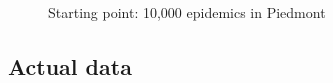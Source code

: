 \documentclass[graybox]{svmult}
\begin{document}
\begin{figure}[t]

     \begin{subfigure}{0.48\textwidth}
         \centering
         \label{10kNoControl}
     \end{subfigure}
     \hfill
     \begin{subfigure}{0.48\textwidth}
         \centering
         \label{10kBasicC}
     \end{subfigure}
     \caption{Starting point: 10,000 epidemics in Piedmont}
     \label{withoutWithFig}
\end{figure}


\subsection{Actual data}
\label{actual}
\end{document}
